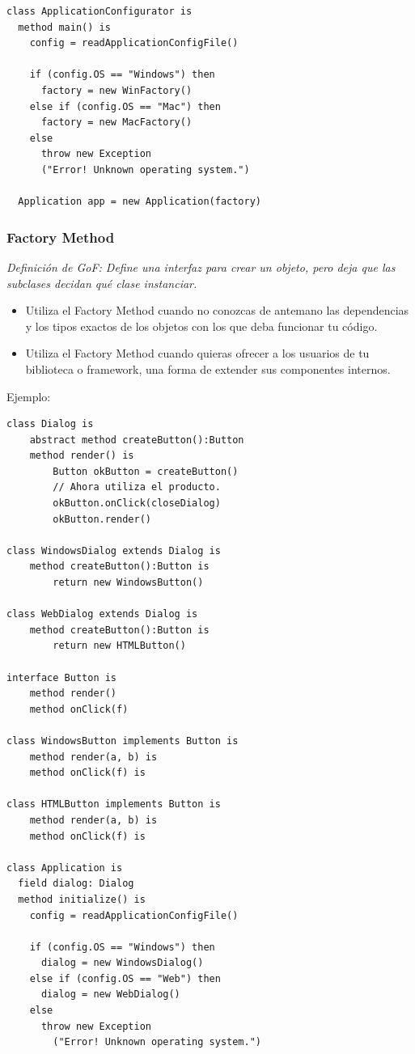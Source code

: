 \documentclass{article}
\begin{document}
\begin{multicols}{2}
\begin{verbatim}
class ApplicationConfigurator is
  method main() is
    config = readApplicationConfigFile()

    if (config.OS == "Windows") then
      factory = new WinFactory()
    else if (config.OS == "Mac") then
      factory = new MacFactory()
    else
      throw new Exception
      ("Error! Unknown operating system.")

  Application app = new Application(factory)
\end{verbatim}

\subsubsection{Factory Method}
\textit{Definición de GoF: Define una interfaz para crear un objeto, pero deja que las subclases decidan qué clase instanciar.}
\begin{itemize}
    \item Utiliza el Factory Method cuando no conozcas de antemano las dependencias y los tipos exactos de los objetos con los que deba funcionar tu código.
    \item Utiliza el Factory Method cuando quieras ofrecer a los usuarios de tu biblioteca o framework, una forma de extender sus componentes internos.
\end{itemize}
Ejemplo:
\begin{verbatim}
class Dialog is
    abstract method createButton():Button
    method render() is
        Button okButton = createButton()
        // Ahora utiliza el producto.
        okButton.onClick(closeDialog)
        okButton.render()

class WindowsDialog extends Dialog is
    method createButton():Button is
        return new WindowsButton()

class WebDialog extends Dialog is
    method createButton():Button is
        return new HTMLButton()

interface Button is
    method render()
    method onClick(f)

class WindowsButton implements Button is
    method render(a, b) is
    method onClick(f) is

class HTMLButton implements Button is
    method render(a, b) is
    method onClick(f) is

class Application is
  field dialog: Dialog
  method initialize() is
    config = readApplicationConfigFile()

    if (config.OS == "Windows") then
      dialog = new WindowsDialog()
    else if (config.OS == "Web") then
      dialog = new WebDialog()
    else
      throw new Exception
        ("Error! Unknown operating system.")
            

\end{verbatim}
\end{multicols}
\end{document}
